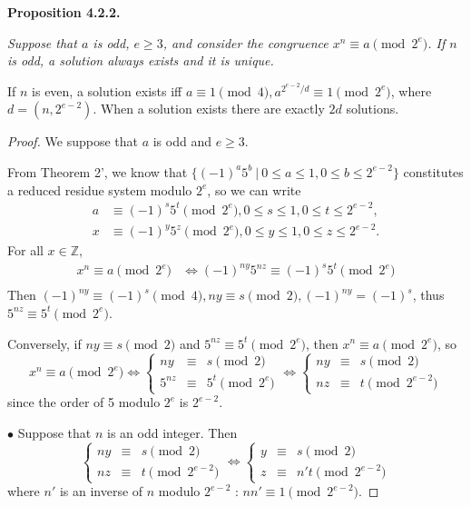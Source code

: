 \documentclass[11pt,a4paper]{article}
\newcommand{\Z}{\mathbb{Z}}
\begin{document}
{\bf Proposition 4.2.2.} {\it Suppose that $a$ is odd, $e\geq 3$, and consider the congruence $x^n \equiv a \pmod {2^e}$. If $n$ is odd, a solution always exists and it is unique.

If $n$ is even, a solution exists iff $a \equiv 1 \pmod 4, a^{2^{e-2}/d} \equiv 1 \pmod{2^e}$, where $d = (n,2^{e-2})$. When a solution exists there are exactly $2d$ solutions.}
\begin{proof}
We suppose that $a$ is odd and $e \geq 3$.

 From Theorem 2', we know that $\{(-1)^a5^b\ \vert \ 0\leq a \leq 1, 0 \leq b \leq 2^{e-2}\}$ constitutes a reduced residue system modulo $2^e$, so we can write 
\begin{align*}
a &\equiv (-1)^s 5^t \pmod {2^e}, 0 \leq s \leq 1, 0 \leq t \leq 2^{e-2},\\
x &\equiv (-1)^y 5^z \pmod {2^e},0 \leq y \leq 1, 0 \leq z \leq 2^{e-2}.
\end{align*}
For all $x \in \Z$,
\begin{align*}
x^n \equiv a\pmod {2^e} &\iff (-1)^{ny} 5^{nz} \equiv (-1)^s 5^t \pmod {2^e}\\
\end{align*}
Then  $(-1)^{ny} \equiv (-1)^s \pmod4, ny\equiv s \pmod 2, (-1)^{ny} = (-1)^s$, thus $5^{nz} \equiv 5^t \pmod{2^e}$.

Conversely, if $ny \equiv s \pmod {2}$ and $5^{nz} \equiv 5^t \pmod{2^e}$, then $x^n\equiv a \pmod{2^e}$, so
$$
x^n\equiv a \pmod{2^e} \iff 
\left\{
\begin{array}{ccl}
  ny& \equiv   &s \pmod{2}   \\
  5^{nz}& \equiv  &    5^t \pmod {2^{e}}
\end{array}
\right.
\iff 
\left\{
\begin{array}{ccl}
  ny& \equiv   &s \pmod{2}   \\
  nz& \equiv  &    t\pmod {2^{e-2}}
\end{array}
\right.
$$
since the order of 5 modulo $2^e$ is $2^{e-2}$.

$\bullet$ Suppose that $n$ is an odd integer. Then
$$
\left\{
\begin{array}{ccl}
  ny& \equiv   &s \pmod{2}   \\
  nz& \equiv  &    t\pmod {2^{e-2}}
\end{array}
\right.
\iff
\left\{
\begin{array}{ccl}
  y& \equiv   &s \pmod{2}   \\
  z& \equiv  &   n' t\pmod {2^{e-2}}
\end{array}
\right.
$$
where $n'$ is an inverse of $n$ modulo $2^{e-2}$ : $nn'\equiv 1 \pmod {2^{e-2}}$.


\end{proof}
\end{document}
